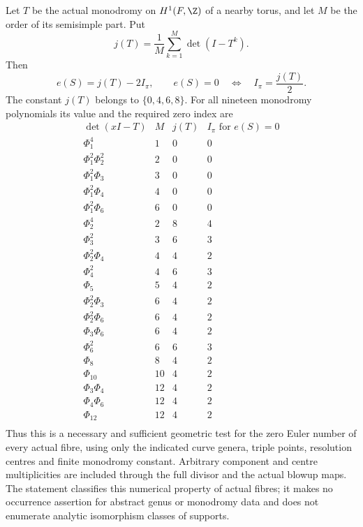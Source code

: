 \begin{proposition}
Let $T$ be the actual monodromy on $H^1(F,\Z)$
of a nearby torus, and let $M$ be the order of
its semisimple part. Put
\[
             j(T)=\frac1M\sum_{k=1}^{M}\det(I-T^k).
                                                               \tag{C.ZC.2}\label{cdp:eq:C.ZC.2}
\]
Then
\[
                e(S)=j(T)-2I_\pi,\qquad
                e(S)=0\quad\Longleftrightarrow\quad
                         I_\pi=\frac{j(T)}2 .        \tag{C.ZC.3}\label{cdp:eq:C.ZC.3}
\]
The constant $j(T)$ belongs to $\{0,4,6,8\}$.
For all nineteen monodromy polynomials its
value and the required zero index are
\[
 \begin{array}{c|r|r|r}
\det(xI-T)&M&j(T)&I_\pi\text{ for }e(S)=0\\ \hline
\Phi_{1}^{4}&1&0&0\\
\Phi_{1}^{2} \Phi_{2}^{2}&2&0&0\\
\Phi_{1}^{2} \Phi_{3}&3&0&0\\
\Phi_{1}^{2} \Phi_{4}&4&0&0\\
\Phi_{1}^{2} \Phi_{6}&6&0&0\\
\Phi_{2}^{4}&2&8&4\\
\Phi_{3}^{2}&3&6&3\\
\Phi_{2}^{2} \Phi_{4}&4&4&2\\
\Phi_{4}^{2}&4&6&3\\
\Phi_{5}&5&4&2\\
\Phi_{2}^{2} \Phi_{3}&6&4&2\\
\Phi_{2}^{2} \Phi_{6}&6&4&2\\
\Phi_{3} \Phi_{6}&6&4&2\\
\Phi_{6}^{2}&6&6&3\\
\Phi_{8}&8&4&2\\
\Phi_{10}&10&4&2\\
\Phi_{3} \Phi_{4}&12&4&2\\
\Phi_{4} \Phi_{6}&12&4&2\\
\Phi_{12}&12&4&2\\
\end{array}
                                                               \tag{C.ZC.4}\label{cdp:eq:C.ZC.4}
\]
Thus this is a necessary and sufficient
geometric test for the zero Euler number of
every actual fibre, using only the indicated
curve genera, triple points, resolution centres
and finite monodromy constant. Arbitrary
component and centre multiplicities are
included through the full divisor and the
actual blowup maps. The statement classifies
this numerical property of actual fibres;
it makes no occurrence assertion for abstract
genus or monodromy data and does not enumerate
analytic isomorphism classes of supports.
\end{proposition}

